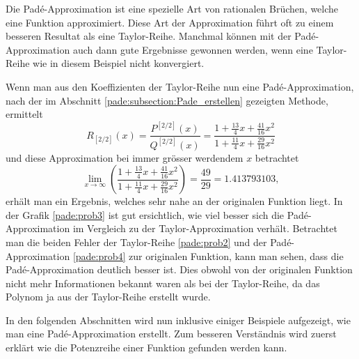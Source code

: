 Die Padé-Approximation ist eine spezielle Art von rationalen Brüchen, welche eine Funktion approximiert.
Diese Art der Approximation führt oft zu einem besseren Resultat als eine Taylor-Reihe. 
Manchmal können mit der Padé-Approximation auch dann gute Ergebnisse gewonnen werden, wenn eine Taylor-Reihe wie in diesem Beispiel nicht konvergiert. 

Wenn man aus den Koeffizienten der Taylor-Reihe nun eine Padé-Approximation, nach der im Abschnitt \ref{pade:subsection:Pade_erstellen} gezeigten Methode, ermittelt 
\begin{equation*}
R_{[2/ 2]}(x)
=
\frac{P^{[2/2]}(x)}{Q^{[2/2]}(x)}
=
\frac{1+\frac{13}{4}x+\frac{41}{16}x^2}{1 + \frac{11}{4}x + \frac{29}{16}x^2} 
\label{pade:bspordnung2}
\end{equation*}
und diese Approximation bei immer grösser werdendem $x$ betrachtet
\begin{equation*}
\lim_{x \to \infty}
\left(
\frac{1+\frac{13}{4}x+\frac{41}{16}x^2}{1 + \frac{11}{4}x + \frac{29}{16}x^2} 
\right)
=
\frac{49}{29} = 1.413793103,
\end{equation*}
erhält man ein Ergebnis, welches sehr nahe an der originalen Funktion liegt. 
In der Grafik \ref{pade:prob3} ist gut ersichtlich, wie viel besser sich die Padé-Approximation im Vergleich zu der Taylor-Approximation verhält.
Betrachtet man die beiden Fehler der Taylor-Reihe \ref{pade:prob2} und der Padé-Approximation \ref{pade:prob4} zur originalen Funktion, kann man sehen, dass die Padé-Approximation deutlich besser ist.
Dies obwohl von der originalen Funktion nicht mehr Informationen bekannt waren als bei der Taylor-Reihe, da das Polynom ja aus der Taylor-Reihe erstellt wurde.

In den folgenden Abschnitten wird nun inklusive einiger Beispiele aufgezeigt, wie man eine Padé-Approximation erstellt.
Zum besseren Verständnis wird zuerst erklärt wie die Potenzreihe einer Funktion gefunden werden kann.










